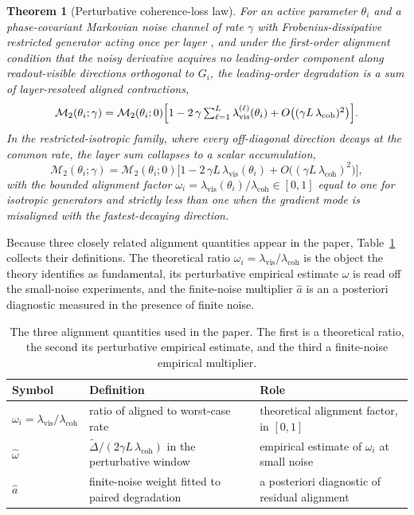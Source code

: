 \documentclass[10pt,a4paper]{amsart}
\newtheorem{theorem}{Theorem}
\newcommand{\Mtwo}{\mathcal{M}_2}
\newcommand{\lcoh}{\lambda_{\mathrm{coh}}}
\newcommand{\lvis}{\lambda_{\mathrm{vis}}}
\newcommand{\weff}{\widehat{\omega}}
\newcommand{\aeff}{\widehat{a}}
\begin{document}
\begin{theorem}[Perturbative coherence-loss law]\label{thm:perturb}
For an active parameter $\theta_i$ and a phase-covariant Markovian noise channel of rate $\gamma$ with Frobenius-dissipative restricted generator acting once per layer \cite{holevo1996,lindblad1976,gks1976}, and under the first-order alignment condition that the noisy derivative acquires no leading-order component along readout-visible directions orthogonal to $G_i$, the leading-order degradation is a sum of layer-resolved aligned contractions,
\begin{equation}
    \Mtwo(\theta_i;\gamma)
    =
    \Mtwo(\theta_i;0)
    \Bigl[1-2\,\gamma\textstyle\sum_{\ell=1}^{L}\lvis^{(\ell)}(\theta_i)+O\bigl((\gamma L\,\lcoh)^2\bigr)\Bigr].
    \label{eq:perturb}
\end{equation}
In the restricted-isotropic family, where every off-diagonal direction decays at the common rate, the layer sum collapses to a scalar accumulation,
\begin{equation}
    \Mtwo(\theta_i;\gamma)
    =
    \Mtwo(\theta_i;0)
    \bigl[1-2\,\gamma L\,\lvis(\theta_i)+O\bigl((\gamma L\,\lcoh)^2\bigr)\bigr],
    \label{eq:perturbscalar}
\end{equation}
with the bounded alignment factor $\omega_i=\lvis(\theta_i)/\lcoh\in[0,1]$ equal to one for isotropic generators and strictly less than one when the gradient mode is misaligned with the fastest-decaying direction.
\end{theorem}


Because three closely related alignment quantities appear in the paper, Table~\ref{tab:alignment} collects their definitions. The theoretical ratio $\omega_i=\lvis/\lcoh$ is the object the theory identifies as fundamental, its perturbative empirical estimate $\weff$ is read off the small-noise experiments, and the finite-noise multiplier $\aeff$ is an a posteriori diagnostic measured in the presence of finite noise.

\begin{table}[t]
\caption{The three alignment quantities used in the paper. The first is a theoretical ratio, the second its perturbative empirical estimate, and the third a finite-noise empirical multiplier.}\label{tab:alignment}
\centering
\begin{tabular}{@{}lll@{}}
\toprule
Symbol & Definition & Role\\
\midrule
$\omega_i=\lvis/\lcoh$ & ratio of aligned to worst-case rate & theoretical alignment factor, in $[0,1]$\\
$\weff$ & $\widetilde{\Delta}/(2\gamma L\,\lcoh)$ in the perturbative window & empirical estimate of $\omega_i$ at small noise\\
$\aeff$ & finite-noise weight fitted to paired degradation & a posteriori diagnostic of residual alignment\\
\bottomrule
\end{tabular}
\end{table}
\end{document}
